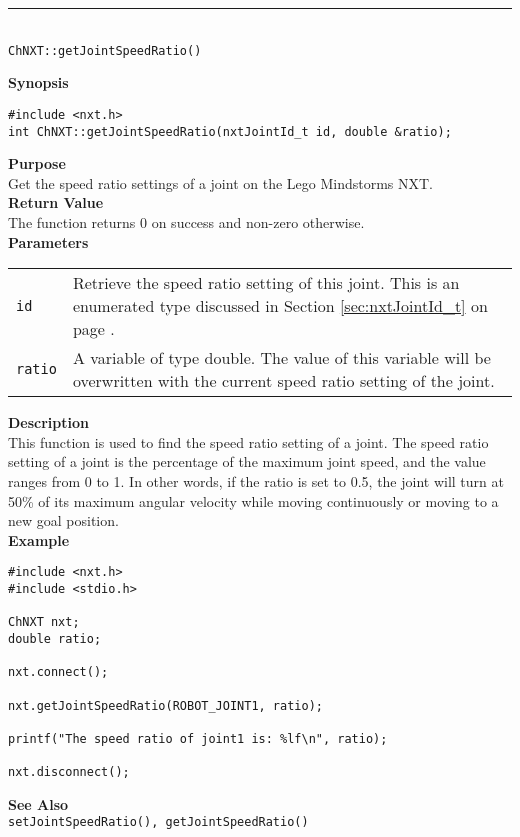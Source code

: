 \noindent
\vspace{5pt}
\rule{4.5in}{0.015in}\\
\noindent
{\LARGE \texttt{ChNXT::getJointSpeedRatio()}}\\
{}

\noindent
{\bf Synopsis}
\vspace{-8pt}
\begin{verbatim}
#include <nxt.h>
int ChNXT::getJointSpeedRatio(nxtJointId_t id, double &ratio);
\end{verbatim}

\noindent
{\bf Purpose}\\
Get the speed ratio settings of a joint on the Lego Mindstorms NXT.\\

\noindent
{\bf Return Value}\\
The function returns 0 on success and non-zero otherwise.\\

\noindent
{\bf Parameters}
\vspace{-0.1in}
\begin{description}
\item               
\begin{tabular}{p{10 mm}p{145 mm}}
\texttt{id} & Retrieve the speed ratio setting of this joint. This is an 
enumerated type discussed in Section \ref{sec:nxtJointId_t} on page
\pageref{sec:nxtJointId_t}.\\
\texttt{ratio} & A variable of type double. The value of this variable will
be overwritten with the current speed ratio setting of the joint.
\end{tabular}
\end{description}

\noindent
{\bf Description}\\
This function is used to find the speed ratio setting of a joint. The speed
ratio setting of a joint is the percentage of the maximum joint speed, and the
value ranges from 0 to 1. In other words, if the ratio is set to 0.5, the joint 
will turn at 50\% of its maximum angular velocity while moving continuously
or moving to a new goal position.\\

\noindent
{\bf Example}\\
\begin{verbatim}
#include <nxt.h>
#include <stdio.h>

ChNXT nxt;
double ratio;

nxt.connect();

nxt.getJointSpeedRatio(ROBOT_JOINT1, ratio);

printf("The speed ratio of joint1 is: %lf\n", ratio);

nxt.disconnect();
\end{verbatim}

\noindent
{\bf See Also}\\
\texttt{setJointSpeedRatio(), getJointSpeedRatio()}

